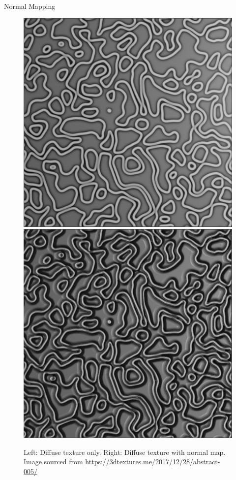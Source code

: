 \documentclass{beamer}
\begin{document}
\begin{frame}[fragile]{Normal Mapping}
    \begin{figure}
        \centering
        \includegraphics[height=0.50\textheight]{images/diffuse_only.png}
        \includegraphics[height=0.50\textheight]{images/diffuse_with_normal.png}
        \caption{
            Left: Diffuse texture only. Right: Diffuse texture with normal map.
            \footnotesize{Image sourced from \url{https://3dtextures.me/2017/12/28/abstract-005/}}}
    \end{figure}
\end{frame}
\end{document}
